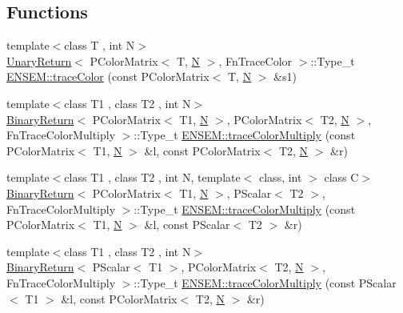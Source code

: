 \subsection*{Functions}
\begin{DoxyCompactItemize}
\item 
{\footnotesize template$<$class T , int N$>$ }\\\mbox{\hyperlink{structUnaryReturn}{Unary\+Return}}$<$ P\+Color\+Matrix$<$ T, \mbox{\hyperlink{adat__devel_2lib_2hadron_2operator__name__util_8cc_a7722c8ecbb62d99aee7ce68b1752f337}{N}} $>$, Fn\+Trace\+Color $>$\+::Type\+\_\+t \mbox{\hyperlink{group__primcolormatrix_ga00fd94578bee0c90e298c41c144c15ee}{E\+N\+S\+E\+M\+::trace\+Color}} (const P\+Color\+Matrix$<$ T, \mbox{\hyperlink{adat__devel_2lib_2hadron_2operator__name__util_8cc_a7722c8ecbb62d99aee7ce68b1752f337}{N}} $>$ \&s1)
\item 
{\footnotesize template$<$class T1 , class T2 , int N$>$ }\\\mbox{\hyperlink{structBinaryReturn}{Binary\+Return}}$<$ P\+Color\+Matrix$<$ T1, \mbox{\hyperlink{adat__devel_2lib_2hadron_2operator__name__util_8cc_a7722c8ecbb62d99aee7ce68b1752f337}{N}} $>$, P\+Color\+Matrix$<$ T2, \mbox{\hyperlink{adat__devel_2lib_2hadron_2operator__name__util_8cc_a7722c8ecbb62d99aee7ce68b1752f337}{N}} $>$, Fn\+Trace\+Color\+Multiply $>$\+::Type\+\_\+t \mbox{\hyperlink{group__primcolormatrix_ga690c734a59a0c81041165c0fe948ef2d}{E\+N\+S\+E\+M\+::trace\+Color\+Multiply}} (const P\+Color\+Matrix$<$ T1, \mbox{\hyperlink{adat__devel_2lib_2hadron_2operator__name__util_8cc_a7722c8ecbb62d99aee7ce68b1752f337}{N}} $>$ \&l, const P\+Color\+Matrix$<$ T2, \mbox{\hyperlink{adat__devel_2lib_2hadron_2operator__name__util_8cc_a7722c8ecbb62d99aee7ce68b1752f337}{N}} $>$ \&r)
\item 
{\footnotesize template$<$class T1 , class T2 , int N, template$<$ class, int $>$ class C$>$ }\\\mbox{\hyperlink{structBinaryReturn}{Binary\+Return}}$<$ P\+Color\+Matrix$<$ T1, \mbox{\hyperlink{adat__devel_2lib_2hadron_2operator__name__util_8cc_a7722c8ecbb62d99aee7ce68b1752f337}{N}} $>$, P\+Scalar$<$ T2 $>$, Fn\+Trace\+Color\+Multiply $>$\+::Type\+\_\+t \mbox{\hyperlink{group__primcolormatrix_gac1ebb50e5da5705b401fc6a361b951c5}{E\+N\+S\+E\+M\+::trace\+Color\+Multiply}} (const P\+Color\+Matrix$<$ T1, \mbox{\hyperlink{adat__devel_2lib_2hadron_2operator__name__util_8cc_a7722c8ecbb62d99aee7ce68b1752f337}{N}} $>$ \&l, const P\+Scalar$<$ T2 $>$ \&r)
\item 
{\footnotesize template$<$class T1 , class T2 , int N$>$ }\\\mbox{\hyperlink{structBinaryReturn}{Binary\+Return}}$<$ P\+Scalar$<$ T1 $>$, P\+Color\+Matrix$<$ T2, \mbox{\hyperlink{adat__devel_2lib_2hadron_2operator__name__util_8cc_a7722c8ecbb62d99aee7ce68b1752f337}{N}} $>$, Fn\+Trace\+Color\+Multiply $>$\+::Type\+\_\+t \mbox{\hyperlink{group__primcolormatrix_ga0e0db533c0e6dc778fc9f271537b96eb}{E\+N\+S\+E\+M\+::trace\+Color\+Multiply}} (const P\+Scalar$<$ T1 $>$ \&l, const P\+Color\+Matrix$<$ T2, \mbox{\hyperlink{adat__devel_2lib_2hadron_2operator__name__util_8cc_a7722c8ecbb62d99aee7ce68b1752f337}{N}} $>$ \&r)

\end{DoxyCompactItemize}
